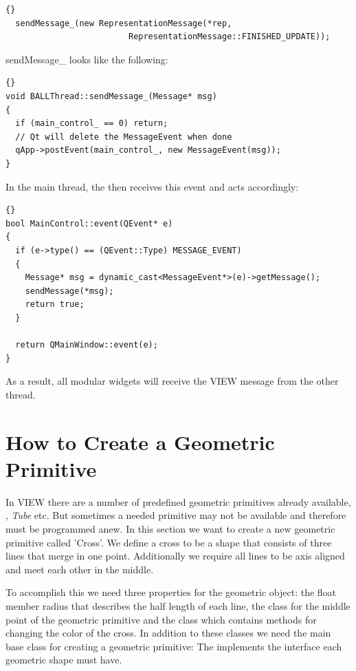\begin{lstlisting}{}
  sendMessage_(new RepresentationMessage(*rep,
                         RepresentationMessage::FINISHED_UPDATE));
\end{lstlisting}

\noindent
sendMessage\_ looks like the following:

\begin{lstlisting}{}
void BALLThread::sendMessage_(Message* msg)
{
  if (main_control_ == 0) return;
  // Qt will delete the MessageEvent when done
  qApp->postEvent(main_control_, new MessageEvent(msg));
}
\end{lstlisting}

\noindent
In the main thread, the  then receives this event and acts
accordingly:

\begin{lstlisting}{}
bool MainControl::event(QEvent* e)
{
  if (e->type() == (QEvent::Type) MESSAGE_EVENT)
  {
    Message* msg = dynamic_cast<MessageEvent*>(e)->getMessage();
    sendMessage(*msg);
    return true;
  }

  return QMainWindow::event(e);
}
\end{lstlisting}

\noindent
As a result, all modular widgets will receive the VIEW message from the other
thread.


\section{How to Create a Geometric Primitive}
\label{section:view_create_a_geometric_primitive}

In VIEW there are a number of predefined geometric primitives already 
available, , {\em Tube} etc. But sometimes a needed primitive 
may not be available and therefore must be programmed anew. 
In this section we want to create a new geometric primitive called 'Cross'.
We define a cross to be a shape that consists of three lines that merge in one
point. Additionally we require all lines to be axis aligned and meet each
other in the middle.

To accomplish this we need three properties for the geometric object: the
float member radius that describes the half length of each line, the class 
 for the middle point of the geometric primitive and the class 
 which contains methods for changing the color of the
cross. In addition to these classes we need the main base class for
creating a geometric primitive: The  
implements the interface each geometric shape must have.

